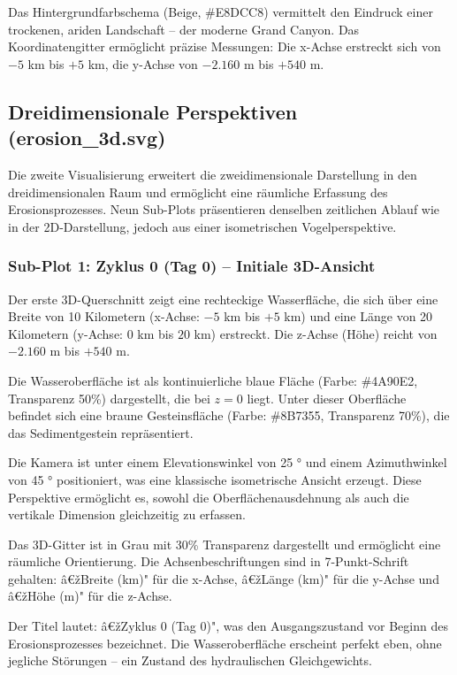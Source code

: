Das Hintergrundfarbschema (Beige, \#E8DCC8) vermittelt den Eindruck einer trockenen, ariden Landschaft -- der moderne Grand Canyon. Das Koordinatengitter ermöglicht präzise Messungen: Die x-Achse erstreckt sich von $-5$ km bis $+5$ km, die y-Achse von $-2.160$ m bis $+540$ m.

\subsection{Dreidimensionale Perspektiven (erosion\_3d.svg)}

Die zweite Visualisierung erweitert die zweidimensionale Darstellung in den dreidimensionalen Raum und ermöglicht eine räumliche Erfassung des Erosionsprozesses. Neun Sub-Plots präsentieren denselben zeitlichen Ablauf wie in der 2D-Darstellung, jedoch aus einer isometrischen Vogelperspektive.

\subsubsection*{Sub-Plot 1: Zyklus 0 (Tag 0) -- Initiale 3D-Ansicht}

Der erste 3D-Querschnitt zeigt eine rechteckige Wasserfläche, die sich über eine Breite von 10 Kilometern (x-Achse: $-5$ km bis $+5$ km) und eine Länge von 20 Kilometern (y-Achse: $0$ km bis $20$ km) erstreckt. Die z-Achse (Höhe) reicht von $-2.160$ m bis $+540$ m.

Die Wasseroberfläche ist als kontinuierliche blaue Fläche (Farbe: \#4A90E2, Transparenz 50\%) dargestellt, die bei $z = 0$ liegt. Unter dieser Oberfläche befindet sich eine braune Gesteinsfläche (Farbe: \#8B7355, Transparenz 70\%), die das Sedimentgestein repräsentiert.

Die Kamera ist unter einem Elevationswinkel von 25 ° und einem Azimuthwinkel von 45 ° positioniert, was eine klassische isometrische Ansicht erzeugt. Diese Perspektive ermöglicht es, sowohl die Oberflächenausdehnung als auch die vertikale Dimension gleichzeitig zu erfassen.

Das 3D-Gitter ist in Grau mit 30\% Transparenz dargestellt und ermöglicht eine räumliche Orientierung. Die Achsenbeschriftungen sind in 7-Punkt-Schrift gehalten: â€žBreite (km)" für die x-Achse, â€žLänge (km)" für die y-Achse und â€žHöhe (m)" für die z-Achse.

Der Titel lautet: â€žZyklus 0 (Tag 0)", was den Ausgangszustand vor Beginn des Erosionsprozesses bezeichnet. Die Wasseroberfläche erscheint perfekt eben, ohne jegliche Störungen -- ein Zustand des hydraulischen Gleichgewichts.

